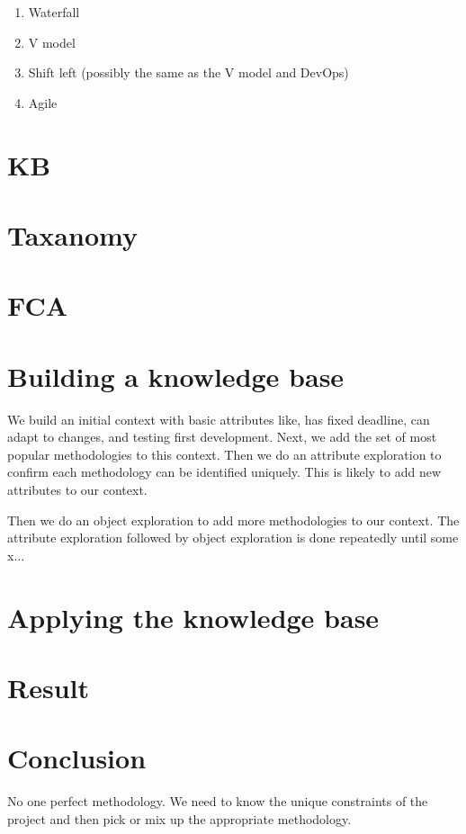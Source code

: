 \documentclass{article}
\begin{document}
\begin{enumerate}
  \item Waterfall
  \item V model
  \item Shift left (possibly the same as the V model and DevOps)
  \item Agile
\end{enumerate}

\section{KB}
\section{Taxanomy}
\section{FCA}

\section{Building a knowledge base}
We build an initial context with basic attributes like, has fixed deadline, can adapt to changes, and testing first development.
Next, we add the set of most popular methodologies to this context.
Then we do an attribute exploration to confirm each methodology can be identified uniquely.
This is likely to add new attributes to our context.

Then we do an object exploration to add more methodologies to our context.
The attribute exploration followed by object exploration is done repeatedly until some x...

\section{Applying the knowledge base}

\section{Result}
\section{Conclusion}
No one perfect methodology.
We need to know the unique constraints of the project and then pick or mix up the appropriate methodology.
\end{document}
